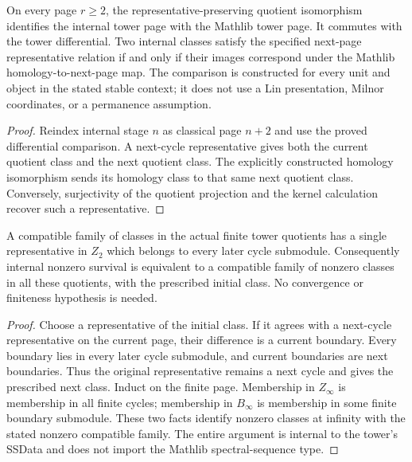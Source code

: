 \begin{proposition}
  \label{prop:h6-tower-internal-comparison}
  \leanok
  On every page $r\ge2$, the representative-preserving quotient isomorphism
  identifies the internal tower page with the Mathlib tower page. It commutes
  with the tower differential. Two internal classes satisfy the specified
  next-page representative relation if and only if their images correspond
  under the Mathlib homology-to-next-page map. The comparison is constructed
  for every unit and object in the stated stable context; it does not use
  a Lin presentation, Milnor coordinates, or a permanence assumption.
\end{proposition}
\begin{proof}
  Reindex internal stage $n$ as classical page $n+2$ and use the proved
  differential comparison. A next-cycle representative gives both the
  current quotient class and the next quotient class. The explicitly
  constructed homology isomorphism sends its homology class to that same
  next quotient class. Conversely, surjectivity of the quotient projection
  and the kernel calculation recover such a representative.
  \leanok
\end{proof}

\begin{proposition}
  \label{prop:h6-tower-common-representative}
  \leanok
  A compatible family of classes in the actual finite tower quotients
  has a single representative in $Z_2$ which belongs to every later cycle
  submodule. Consequently internal nonzero survival is equivalent to a
  compatible family of nonzero classes in all these quotients, with the
  prescribed initial class. No convergence or finiteness hypothesis is needed.
\end{proposition}
\begin{proof}
  Choose a representative of the initial class. If it agrees with a
  next-cycle representative on the current page, their difference is a
  current boundary. Every boundary lies in every later cycle submodule,
  and current boundaries are next boundaries. Thus the original representative
  remains a next cycle and gives the prescribed next class. Induct on the
  finite page. Membership in $Z_\infty$ is membership in all finite cycles;
  membership in $B_\infty$ is membership in some finite boundary submodule.
  These two facts identify nonzero classes at infinity with the stated
  nonzero compatible family. The entire argument is internal to the tower's
  SSData and does not import the Mathlib spectral-sequence type.
  \leanok
\end{proof}

